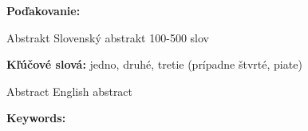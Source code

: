 \documentclass[12pt, oneside]{book}
\theoremstyle{definition} \newtheorem{defi}{Definícia}
\begin{document}
\vfill
{\bf Poďakovanie:}


\newpage 
\thispagestyle{empty}

\huge{Abstrakt}
\normalsize
\newline
Slovenský abstrakt 100-500 slov

{\bf Kľúčové slová:} jedno, druhé, tretie (prípadne štvrté, piate)


\newpage 
\thispagestyle{empty}

\huge{Abstract}
\normalsize
\newline
English abstract

{\bf Keywords:} 


%
%



\newpage 

\tableofcontents



\newpage 

\listoffigures


\mainmatter


 











\end{document}
